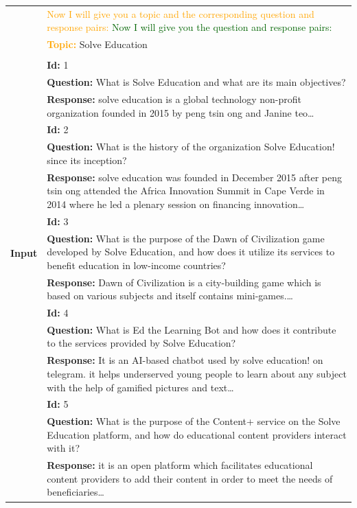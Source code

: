 \documentclass[11pt]{article}
\begin{document}
{\begin{longtable}{c p{12cm}}
\midrule




\multirow{38}{*}{\textbf{Input}} & \textcolor{orange}{Now I will give you a topic and the corresponding question and response pairs:}
\textcolor{darkgreen}{Now I will give you the question and response pairs:}\\
& \textcolor{orange}{\textbf{Topic:}} Solve Education  \\
\\
&\textbf{Id:} 1 \\
&\textbf{Question:} What is Solve Education and what are its main objectives? \\
&\textbf{Response:} solve education is a global technology non-profit organization founded in 2015 by peng tsin ong and Janine teo\dots\\
&\textbf{Id:} 2\\
&\textbf{Question:} What is the history of the organization Solve Education! since its inception? \\
&\textbf{Response:} solve education was founded in December 2015 after peng tsin ong attended the Africa Innovation Summit in Cape Verde in 2014   where he led a plenary session on financing innovation\dots\\
&\textbf{Id:} 3\\
&\textbf{Question:} What is the purpose of the Dawn of Civilization game developed by Solve Education, and how does it utilize its services to benefit education in low-income countries? \\
&\textbf{Response:} Dawn of Civilization is a city-building game which is based on various subjects and itself contains mini-games.\dots\\
&\textbf{Id:} 4\\
&\textbf{Question:} What is Ed the Learning Bot and how does it contribute to the services provided by Solve Education? \\
&\textbf{Response:} It is an AI-based chatbot used by solve education! on telegram. it helps underserved young people to learn about any subject with the help of gamified pictures and text\dots\\
&\textbf{Id:} 5\\
&\textbf{Question:} What is the purpose of the Content+ service on the Solve Education platform, and how do educational content providers interact with it? \\
&\textbf{Response:} it is an open platform which facilitates educational content providers to add their content in order to meet the needs of beneficiaries\dots\\

\end{longtable}}
\end{document}
